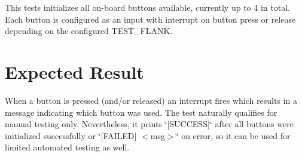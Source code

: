 This tests initializes all on-\/board buttons available, currently up to 4 in total. Each button is configured as an input with interrupt on button press or release depending on the configured T\+E\+S\+T\+\_\+\+F\+L\+A\+NK.

\section*{Expected Result}

When a button is pressed (and/or released) an interrupt fires which results in a message indicating which button was used. The test naturally qualifies for manual testing only. Nevertheless, it prints \char`\"{}\mbox{[}\+S\+U\+C\+C\+E\+S\+S\mbox{]}\char`\"{} after all buttons were initialized successfully or \char`\"{}\mbox{[}\+F\+A\+I\+L\+E\+D\mbox{]} $<$msg$>$\char`\"{} on error, so it can be used for limited automated testing as well. 
